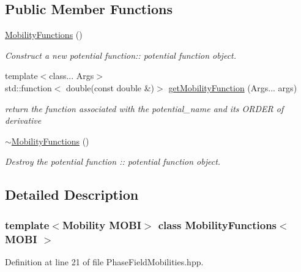 \subsection*{Public Member Functions}
\begin{DoxyCompactItemize}
\item 
\mbox{\label{classMobilityFunctions_add3cbc5101d579b77a2c2963e8008101}} 
\hyperlink{classMobilityFunctions_add3cbc5101d579b77a2c2963e8008101}{Mobility\+Functions} ()
\begin{DoxyCompactList}\small\item\em Construct a new potential function\+:\+: potential function object. \end{DoxyCompactList}\item 
{\footnotesize template$<$class... Args$>$ }\\std\+::function$<$ double(const double \&)$>$ \hyperlink{classMobilityFunctions_a25741d28fd09272b2647f5af944aa748}{get\+Mobility\+Function} (Args... args)
\begin{DoxyCompactList}\small\item\em return the function associated with the potential\+\_\+name and its O\+R\+D\+ER of derivative \end{DoxyCompactList}\item 
\mbox{\label{classMobilityFunctions_aef50ad1966cd9afc7b61ab5eb25df771}} 
\hyperlink{classMobilityFunctions_aef50ad1966cd9afc7b61ab5eb25df771}{$\sim$\+Mobility\+Functions} ()
\begin{DoxyCompactList}\small\item\em Destroy the potential function \+:\+: potential function object. \end{DoxyCompactList}\end{DoxyCompactItemize}


\subsection{Detailed Description}
\subsubsection*{template$<$Mobility M\+O\+BI$>$\newline
class Mobility\+Functions$<$ M\+O\+B\+I $>$}



Definition at line 21 of file Phase\+Field\+Mobilities.\+hpp.



